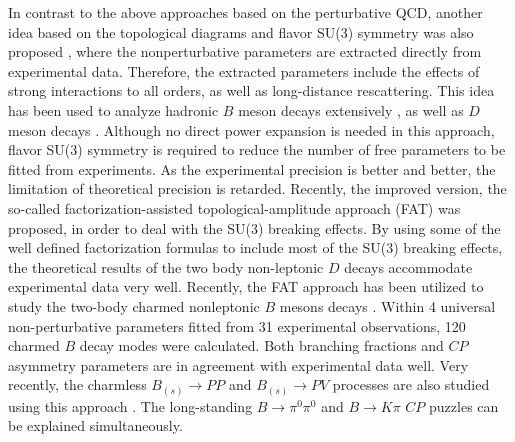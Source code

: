 \documentclass[11pt]{article}
\begin{document}
In contrast to the above approaches based on the perturbative QCD, another idea  based on the topological diagrams and flavor  SU(3) symmetry   was also proposed \cite{diagramapp},   where  the nonperturbative parameters are   extracted directly from experimental data. Therefore, the extracted parameters include the effects of strong interactions to all orders, as well as long-distance rescattering. This idea has been used to analyze hadronic $B$ meson decays extensively \cite{cwchiangB}, as well as $D$ meson decays \cite{Cheng:2012xb}. Although no direct power expansion is needed in this approach, flavor SU(3) symmetry is required to reduce the number of free parameters to be fitted from experiments. As the experimental precision is better and better, the limitation of theoretical precision is retarded.  Recently, the improved version, the so-called factorization-assisted topological-amplitude  approach (FAT) \cite{Li:2012cfa} was proposed, in order to deal with the SU(3) breaking effects. By using some of  the well defined factorization  formulas to include  most of the SU(3) breaking effects, the theoretical results of the two body non-leptonic $D$ decays accommodate experimental data very well. Recently, the FAT approach has been utilized to study the two-body charmed nonleptonic $B$ mesons decays    \cite{Zhou:2015jba}. Within 4 universal non-perturbative parameters fitted from 31 experimental observations, 120 charmed $B$ decay modes were calculated.   Both branching fractions and $CP$ asymmetry parameters are in agreement with experimental data well. Very recently, the charmless $B_{(s)} \to PP$ and $B_{(s)}\to PV$ processes are  also studied using this approach  \cite{Zhou:2016jkv}. The long-standing $B\to \pi^0 \pi^0$ and $B\to K\pi$ $CP$ puzzles can be explained simultaneously.
\end{document}
